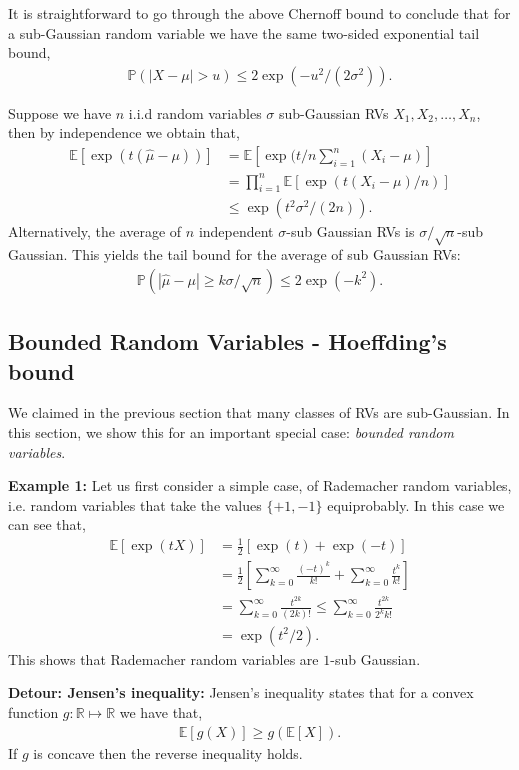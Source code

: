 \documentclass[twoside,12pt]{article}
\begin{document}
It is straightforward to go through the above Chernoff bound to conclude that for a sub-Gaussian random variable we have the same two-sided exponential tail bound,
\begin{align*}
\mathbb{P}(|X - \mu| > u) \leq 2 \exp ( -u^2 /(2 \sigma^2)).
\end{align*}

Suppose we have $n$ i.i.d random variables $\sigma$ sub-Gaussian RVs $X_1,X_2,\ldots,X_n$, then by independence we obtain that,
\begin{align*}
\mathbb{E}[\exp(t(\widehat{\mu} - \mu))] &=  \mathbb{E}[\exp(t/n \sum_{i=1}^n (X_i - \mu)] \\
&=  \prod_{i=1}^n \mathbb{E}[ \exp (t (X_i - \mu)/n)] \\
&\leq   \exp (t^2 \sigma^2 /(2n)).
\end{align*}
Alternatively, the average of $n$ independent $\sigma$-sub Gaussian RVs is $\sigma/\sqrt{n}$-sub Gaussian. 
This yields the tail bound for the average of sub Gaussian RVs:
\begin{align*}
\mathbb{P}( | \widehat{\mu} - \mu| \geq k \sigma/\sqrt{n}) \leq 2 \exp (-k^2).
\end{align*}

\subsection{Bounded Random Variables - Hoeffding's bound}
We claimed in the previous section that many classes of RVs are sub-Gaussian. In this section, we show this for an important special case: \emph{bounded random variables}.

{\bf Example 1: } Let us first consider a simple case, of Rademacher random variables, i.e. random variables that take the values $\{+1,-1\}$ equiprobably. In this case we can see that,
\begin{align*}
\mathbb{E}[\exp(t X) ] &= \frac{1}{2} \left[ \exp(t) + \exp(-t)\right] \\
&= \frac{1}{2} \left[ \sum_{k=0}^\infty \frac{(-t)^k}{k!} +  \sum_{k=0}^\infty \frac{t^k}{k!} \right] \\
&=  \sum_{k=0}^\infty \frac{t^{2k}}{(2k)!} \leq \sum_{k=0}^\infty \frac{t^{2k}}{2^k k!} \\
&= \exp(t^2/2).
\end{align*}
This shows that Rademacher random variables are $1$-sub Gaussian.

{\bf Detour: Jensen's inequality: } Jensen's inequality states that for a convex function $g: \mathbb{R} \mapsto \mathbb{R}$ we have that,
\begin{align*}
\mathbb{E}[g(X)] \geq g(\mathbb{E}[X]).
\end{align*}
If $g$ is concave then the reverse inequality holds.
\end{document}
